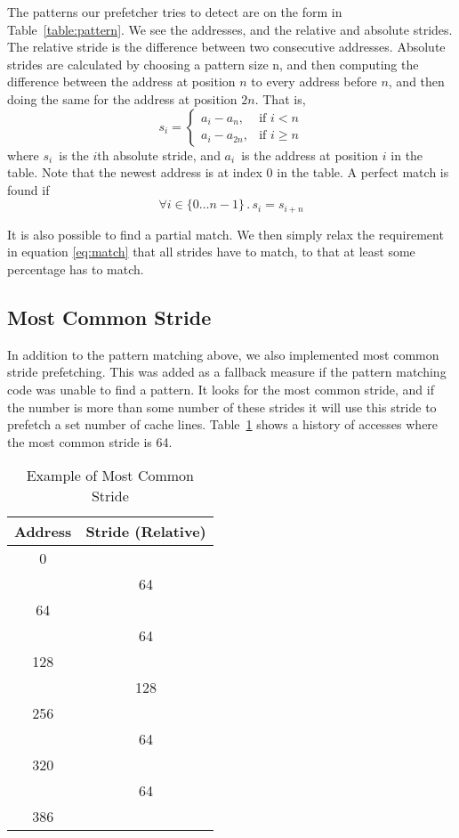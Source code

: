 The patterns our prefetcher tries to detect are on the form in
Table~\ref{table:pattern}.
We see the addresses, and the relative and absolute strides.
The relative stride is the difference between two consecutive
addresses.
Absolute strides are calculated by choosing a pattern size n,
and then computing the difference between the address at position
$n$ to every address before $n$, and then doing the same for the address
at position $2n$.
That is,
\[
	s_i = \begin{cases}
		a_i - a_n,    & \text{if } i  < n \\%
		a_i - a_{2n}, & \text{if } i \geq n %
	\end{cases}
\]
where $s_i$~is the $i$th absolute stride, and $a_i$~is the address at position
$i$ in the table. Note that the newest address is at index 0 in the table. A
perfect match is found if
\begin{equation}
\label{eq:match}
\forall i \in \{0 \dots n - 1\} \,.\, s_i = s_{i + n}
\end{equation}

It is also possible to find a partial match. We then simply relax the
requirement in equation \eqref{eq:match} that all strides have to match, to
that at least some percentage has to match.


\subsection{Most Common Stride}

In addition to the pattern matching above, we also implemented most common stride
prefetching. This was added as a fallback measure if the pattern matching code
was unable to find a pattern.
It looks for the most common stride, and if the number
is more than some number
of these strides it will use this stride to prefetch a
set number of cache lines.
Table~\ref{table:mcs} shows a history of accesses
where the most common stride is 64.
\begin{table}
	\caption{Example of Most Common Stride}
	\centering
	\label{table:mcs}
	\begin{tabular}{c|c}
		\bfseries Address & \bfseries Stride (Relative)\\
		\hline
		0   & \\
		    & 64\\
		64  & \\
		    & 64\\
		128 & \\
		    & 128\\
		256 & \\
		    & 64\\
		320 & \\
		    & 64\\
		386 & \\
	\end{tabular}
\end{table}

